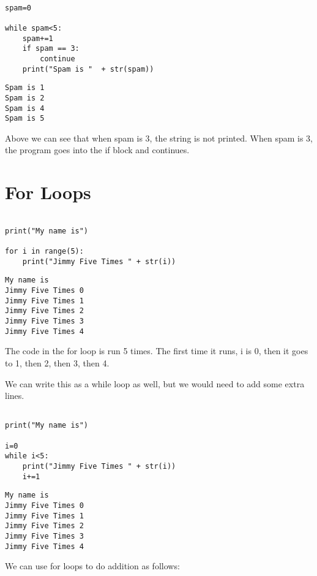 \documentclass[11pt]{article}
\begin{document}
\begin{verbatim}

spam=0

while spam<5:
    spam+=1
    if spam == 3:
        continue
    print("Spam is "  + str(spam))

\end{verbatim}

\begin{verbatim}
Spam is 1
Spam is 2
Spam is 4
Spam is 5
\end{verbatim}



Above we can see that when spam is 3, the string is not printed. When spam is 3, the program goes into the if block and continues.

\section{For Loops}
\label{sec:orge727d62}

\begin{verbatim}

print("My name is")

for i in range(5):
    print("Jimmy Five Times " + str(i))

\end{verbatim}

\begin{verbatim}
My name is
Jimmy Five Times 0
Jimmy Five Times 1
Jimmy Five Times 2
Jimmy Five Times 3
Jimmy Five Times 4
\end{verbatim}


The code in the for loop is run 5 times. The first time it runs, i is 0, then it goes to 1, then 2, then 3, then 4.

We can write this as a while loop as well, but we would need to add some extra lines.


\begin{verbatim}

print("My name is")

i=0
while i<5:
    print("Jimmy Five Times " + str(i))
    i+=1

\end{verbatim}

\begin{verbatim}
My name is
Jimmy Five Times 0
Jimmy Five Times 1
Jimmy Five Times 2
Jimmy Five Times 3
Jimmy Five Times 4
\end{verbatim}


We can use for loops to do addition as follows:
\end{document}
